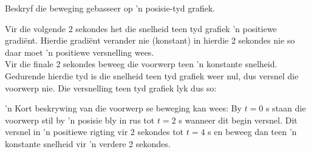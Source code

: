 \begin{wex}{Beskryf die beweging gebasseer op 'n posisie-tyd grafiek.}
{
Vir die volgende 2 sekondes het die snelheid teen tyd grafiek 'n positiewe gradi\"ent. Hierdie gradi\"ent verander nie (konstant) in hierdie 2 sekondes nie so daar moet 'n positiewe versnelling wees. \\

Vir die finale 2 sekondes beweeg die voorwerp teen 'n konstante snelheid. Gedurende hierdie tyd is die snelheid teen tyd grafiek weer nul, dus versnel die voorwerp nie. Die versnelling teen tyd grafiek lyk dus so:

\begin{center}
\end{center}

 'n Kort beskrywing van die voorwerp se beweging kan wees: By $t=0$ s staan die voorwerp stil by 'n posisie bly in rus tot $t=2$ s wanneer dit begin versnel. Dit versnel in 'n positiewe rigting vir 2 sekondes tot $t=4$ s en beweeg dan teen 'n konstante snelheid vir 'n verdere 2 sekondes.
}
\end{wex}

